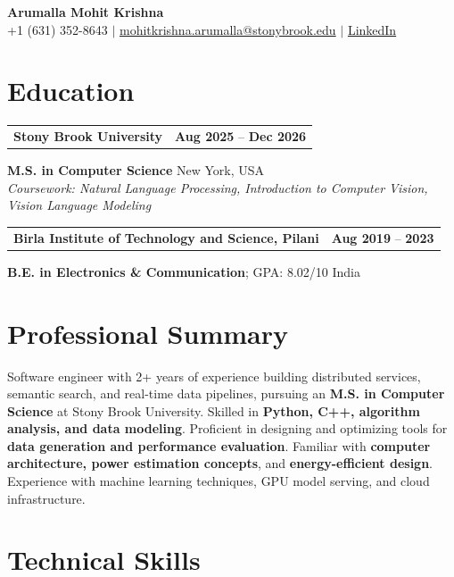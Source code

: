 \documentclass[letterpaper,10pt]{article}
\makeatletter
\newcommand{\entry}[2]{%
  \noindent
  \begin{tabularx}{\linewidth}
    {@{}>{\raggedright\arraybackslash}X@{\hspace{6pt}}r@{}}
    \textbf{#1} & #2
  \end{tabularx}\par
}
\makeatother
\begin{document}
\begin{center}
    {\LARGE\bfseries Arumalla Mohit Krishna}\\[3pt]
    +1 (631) 352-8643 $|$
    \href{mailto:mohitkrishna.arumalla@stonybrook.edu}
    {mohitkrishna.arumalla@stonybrook.edu} $|$
    \href{https://linkedin.com/in/mohit-krishna-arumalla}
    {LinkedIn}
\end{center}
\vspace{-8pt}

\section{Education}

\entry
  {Stony Brook University}
  {\textbf{Aug 2025} -- \textbf{Dec 2026}}

\textbf{M.S. in Computer Science} \hfill New York, USA\\
\textit{
Coursework: Natural Language Processing,
Introduction to Computer Vision, Vision Language Modeling
}
\vspace{3pt}

\entry
  {Birla Institute of Technology and Science, Pilani}
  {\textbf{Aug 2019} -- \textbf{2023}}

\textbf{B.E. in Electronics \& Communication}; GPA: 8.02/10 \hfill India

\section{Professional Summary}

Software engineer with 2+ years of experience building distributed services,
semantic search, and real-time data pipelines, pursuing an \textbf{M.S. in Computer Science} at Stony Brook University. Skilled in \textbf{Python, C++, algorithm analysis, and data modeling}. Proficient in designing and optimizing tools for \textbf{data generation and performance evaluation}. Familiar with \textbf{computer architecture, power estimation concepts}, and \textbf{energy-efficient design}. Experience with machine learning techniques, GPU model serving, and cloud infrastructure.

\section{Technical Skills}
\end{document}
